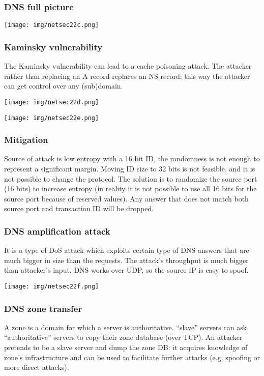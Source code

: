 \documentclass[a4paper, 10pt, titlepage]{article}
\begin{document}
\subsubsection*{DNS full picture}
\begin{center}
	\texttt{[image: img/netsec22c.png]}
\end{center}

\subsubsection{Kaminsky vulnerability}
The Kaminsky vulnerability can lead to a cache poisoning attack. The attacker rather than replacing an A record replaces an NS record: this way the attacker can get control over any
(sub)domain.
\begin{center}
	\texttt{[image: img/netsec22d.png]}
\end{center}
\begin{center}
	\texttt{[image: img/netsec22e.png]}
\end{center}

\subsubsection*{Mitigation}
Source of attack is low entropy with a 16 bit ID, the randomness is not enough to represent a significant margin. Moving ID size to 32 bits is not feasible, and it is not possible to change the protocol. The solution is to randomize the source port (16 bits) to increase entropy (in reality it is not possible to use all 16 bits for the source port because of reserved values). Any answer that does not match both source port and transaction ID will be dropped.

\subsubsection{DNS amplification attack}
It is a type of DoS attack which exploits certain type of DNS answers that are much bigger in size than the requests. The  attack’s throughput is much bigger than attacker’s input. DNS works over UDP, so the source IP is easy to spoof.
\begin{center}
	\texttt{[image: img/netsec22f.png]}
\end{center}

\subsubsection{DNS zone transfer}
A zone is a domain for which a server is authoritative. “slave” servers can ask “authoritative” servers to copy their zone database (over TCP). An attacker pretends to be a slave server and dump the zone DB: it acquires knowledge of zone’s infrastructure and can be used to facilitate further attacks (e.g. spoofing or more direct attacks).
\end{document}

